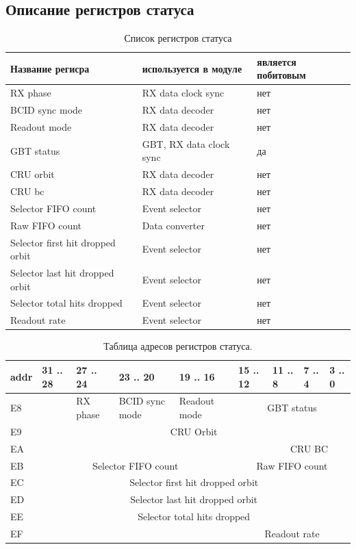 \documentclass{article}
\begin{document}
\subsection{Описание регистров статуса}

\begin{table}[H]
\centering
\begin{tabular}{| l | l | l |}
\hline
Название регисра & используется в модуле & является побитовым \\ \hline
RX phase & RX data clock sync & нет \\ \hline
BCID sync mode & RX data decoder & нет \\ \hline
Readout mode & RX data decoder & нет \\ \hline
GBT status & GBT, RX data clock sync & да \\ \hline
CRU orbit & RX data decoder & нет \\ \hline
CRU bc & RX data decoder & нет \\ \hline
Selector FIFO count & Event selector & нет \\ \hline
Raw FIFO count & Data converter & нет \\ \hline
Selector first hit dropped orbit & Event selector & нет \\ \hline
Selector last hit dropped orbit & Event selector & нет \\ \hline
Selector total hits dropped & Event selector & нет \\ \hline
Readout rate & Event selector & нет \\ \hline
\end{tabular}
\caption{Список регистров статуса\label{tab8}}
\end{table}


\begin{table}[H]
\centering
\begin{tabular}{| l | l | l | l | l | l | l | l | l |}
\hline
addr & 31 .. 28 & 27 .. 24 & 23 .. 20 & 19 .. 16 & 15 .. 12 & 11 .. 8 & 7 .. 4 & 3 .. 0 \\ \hline
E8 &  & RX phase & BCID sync mode & Readout mode & \multicolumn{4}{c|}{GBT status}\\ \hline
E9 &  \multicolumn{8}{c|}{CRU Orbit} \\\hline
EA &  & & & & & \multicolumn{3}{c|}{CRU BC} \\\hline
EB &  \multicolumn{4}{c|}{Selector FIFO count} &  \multicolumn{4}{c|}{Raw FIFO count} \\\hline
EC &  \multicolumn{8}{c|}{Selector first hit dropped orbit} \\\hline
ED &  \multicolumn{8}{c|}{Selector last hit dropped orbit} \\\hline
EE &  \multicolumn{8}{c|}{Selector total hits dropped} \\ \hline
EF &  & & & & \multicolumn{4}{c|}{Readout rate} \\ \hline
\end{tabular}
\caption{Таблица адресов регистров статуса.\label{tab9}}
\end{table}
\end{document}

